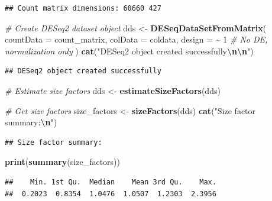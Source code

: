 \documentclass[
]{article}
\newenvironment{Shaded}{\begin{snugshade}}{\end{snugshade}}
\newcommand{\AttributeTok}[1]{\textcolor[rgb]{0.13,0.29,0.53}{#1}}
\newcommand{\CommentTok}[1]{\textcolor[rgb]{0.56,0.35,0.01}{\textit{#1}}}
\newcommand{\DecValTok}[1]{\textcolor[rgb]{0.00,0.00,0.81}{#1}}
\newcommand{\FunctionTok}[1]{\textcolor[rgb]{0.13,0.29,0.53}{\textbf{#1}}}
\newcommand{\NormalTok}[1]{#1}
\newcommand{\OtherTok}[1]{\textcolor[rgb]{0.56,0.35,0.01}{#1}}
\newcommand{\SpecialCharTok}[1]{\textcolor[rgb]{0.81,0.36,0.00}{\textbf{#1}}}
\newcommand{\StringTok}[1]{\textcolor[rgb]{0.31,0.60,0.02}{#1}}
\begin{document}
\begin{verbatim}
## Count matrix dimensions: 60660 427
\end{verbatim}

\begin{Shaded}
\begin{Highlighting}[]
\CommentTok{\# Create DESeq2 dataset object}
\NormalTok{dds }\OtherTok{\textless{}{-}} \FunctionTok{DESeqDataSetFromMatrix}\NormalTok{(}
  \AttributeTok{countData =}\NormalTok{ count\_matrix,}
  \AttributeTok{colData =}\NormalTok{ coldata,}
  \AttributeTok{design =} \SpecialCharTok{\textasciitilde{}} \DecValTok{1}  \CommentTok{\# No DE, normalization only}
\NormalTok{)}
\FunctionTok{cat}\NormalTok{(}\StringTok{"DESeq2 object created successfully}\SpecialCharTok{\textbackslash{}n\textbackslash{}n}\StringTok{"}\NormalTok{)}
\end{Highlighting}
\end{Shaded}

\begin{verbatim}
## DESeq2 object created successfully
\end{verbatim}

\begin{Shaded}
\begin{Highlighting}[]
\CommentTok{\# Estimate size factors}
\NormalTok{dds }\OtherTok{\textless{}{-}} \FunctionTok{estimateSizeFactors}\NormalTok{(dds)}

\CommentTok{\# Get size factors}
\NormalTok{size\_factors }\OtherTok{\textless{}{-}} \FunctionTok{sizeFactors}\NormalTok{(dds)}
\FunctionTok{cat}\NormalTok{(}\StringTok{"Size factor summary:}\SpecialCharTok{\textbackslash{}n}\StringTok{"}\NormalTok{)}
\end{Highlighting}
\end{Shaded}

\begin{verbatim}
## Size factor summary:
\end{verbatim}

\begin{Shaded}
\begin{Highlighting}[]
\FunctionTok{print}\NormalTok{(}\FunctionTok{summary}\NormalTok{(size\_factors))}
\end{Highlighting}
\end{Shaded}

\begin{verbatim}
##    Min. 1st Qu.  Median    Mean 3rd Qu.    Max. 
##  0.2023  0.8354  1.0476  1.0507  1.2303  2.3956
\end{verbatim}
\end{document}
